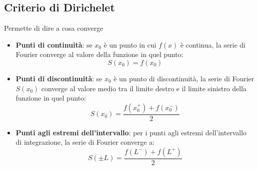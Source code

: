 \documentclass[10pt, a4paper]{article}
\begin{document}
    \subsection{Criterio di Dirichelet}
        Permette di dire a cosa converge
        \begin{itemize}
            \item \textbf{Punti di continuità}: se $x_0$ è un punto in cui $f(x)$ è continua, la serie di Fourier converge al valore della funzione in quel punto: \begin{equation*}
                S(x_0)=f(x_0)
            \end{equation*}
            \item \textbf{Punti di discontinuità}: se $x_0$ è un punto di discontinuità, la serie di Fourier $S(x_0)$ converge al valore medio tra il limite destro e il limite sinistro della funzione in quel punto: \begin{equation*}
                S(x_0)=\frac{f(x_0^+)+f(x_0^-)}{2}
            \end{equation*}
            \item \textbf{Punti agli estremi dell'intervallo}: per i punti agli estremi dell'intervallo di integrazione, la serie di Fourier converge a: \begin{equation*}
                S(\pm L)=\frac{f(L^-)+f(L^+)}{2}
            \end{equation*}
        \end{itemize}
\end{document}
